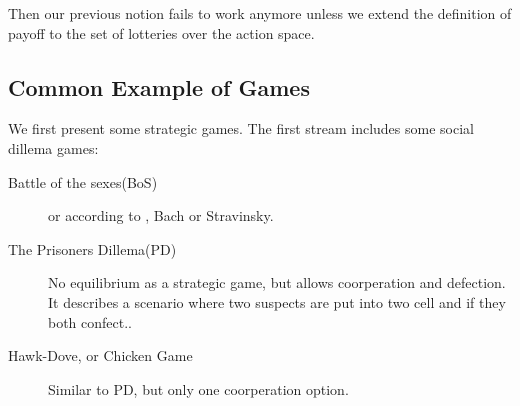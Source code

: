 Then our previous notion fails to work anymore unless we extend the definition of payoff to the set of lotteries over the action space.

\subsection{Common Example of Games}
We first present some strategic games. The first stream includes some social dillema games:
\begin{description}
    \item[Battle of the sexes(BoS)] or according to \citet{Osborne1994-kg}, Bach or Stravinsky.
    \item[The Prisoners Dillema(PD)]  No equilibrium as a strategic game, but allows coorperation and defection. It describes a scenario where two suspects are put into two cell and if they both confect..
    \item[Hawk-Dove, or Chicken Game] Similar to PD, but only one coorperation option. 
\end{description} 

